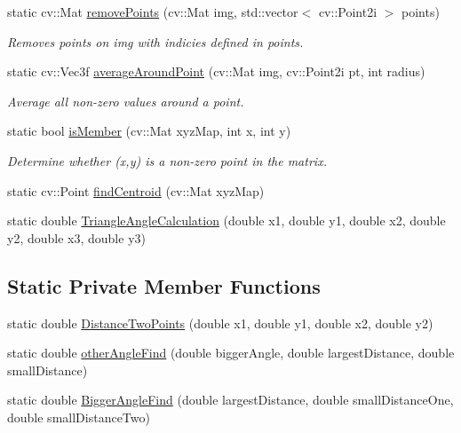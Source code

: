 \begin{DoxyCompactItemize}
\item 
static cv\+::\+Mat \hyperlink{class_util_abf2cc717b8e145166f247df2742a0325}{remove\+Points} (cv\+::\+Mat img, std\+::vector$<$ cv\+::\+Point2i $>$ points)
\begin{DoxyCompactList}\small\item\em Removes points on img with indicies defined in points. \end{DoxyCompactList}\item 
static cv\+::\+Vec3f \hyperlink{class_util_ab6f41d0184eb52fb8830119b01fde445}{average\+Around\+Point} (cv\+::\+Mat img, cv\+::\+Point2i pt, int radius)
\begin{DoxyCompactList}\small\item\em Average all non-\/zero values around a point. \end{DoxyCompactList}\item 
static bool \hyperlink{class_util_acb6daa4dafb8af9adffa1fea2600a40d}{is\+Member} (cv\+::\+Mat xyz\+Map, int x, int y)
\begin{DoxyCompactList}\small\item\em Determine whether (x,y) is a non-\/zero point in the matrix. \end{DoxyCompactList}\item 
static cv\+::\+Point \hyperlink{class_util_a0d0aff128bc986da5140cacd41759e0e}{find\+Centroid} (cv\+::\+Mat xyz\+Map)
\item 
static double \hyperlink{class_util_a05321942460c7b903b8b8ae54d170bb8}{Triangle\+Angle\+Calculation} (double x1, double y1, double x2, double y2, double x3, double y3)
\end{DoxyCompactItemize}
\subsection*{Static Private Member Functions}
\begin{DoxyCompactItemize}
\item 
static double \hyperlink{class_util_aa03b701f4479e96b87e122abaa87804d}{Distance\+Two\+Points} (double x1, double y1, double x2, double y2)
\item 
static double \hyperlink{class_util_a0c066313814add2ed693792e7643a3c3}{other\+Angle\+Find} (double bigger\+Angle, double largest\+Distance, double small\+Distance)
\item 
static double \hyperlink{class_util_a93b18008f3d21bd77445eb6901c8e4d3}{Bigger\+Angle\+Find} (double largest\+Distance, double small\+Distance\+One, double small\+Distance\+Two)
\end{DoxyCompactItemize}


